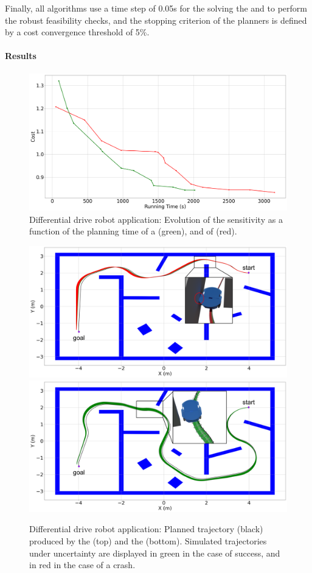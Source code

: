 Finally, all algorithms use a time step of 0.05s for the solving the  and to perform the robust feasibility checks, and the stopping criterion of the planners is defined by a cost convergence threshold of 5\%.

\paragraph{Results}



\begin{figure} [b!]
    \centering
    \includegraphics[width=0.6\linewidth]{figures/samp/unicycle_cost_conv.png} 
    \caption{Differential drive robot application: Evolution of the sensitivity as a function of the planning time of a  (green), and of  (red).}%
    \label{fig:samp_unic_time}%
\end{figure}

\begin{figure} [t!]
    \centering
    \includegraphics[width=0.85\linewidth]{figures/samp/non_robust_unic.png}
    \includegraphics[width=0.85\linewidth]{figures/samp/robust_unic.png}
    \caption{Differential drive robot application: Planned trajectory (black) produced by the  (top) and the  (bottom). 
    Simulated trajectories under uncertainty are displayed in green in the case of success, and in red in the case of a crash.}%
    \label{fig:robust_unic}%
\end{figure}

